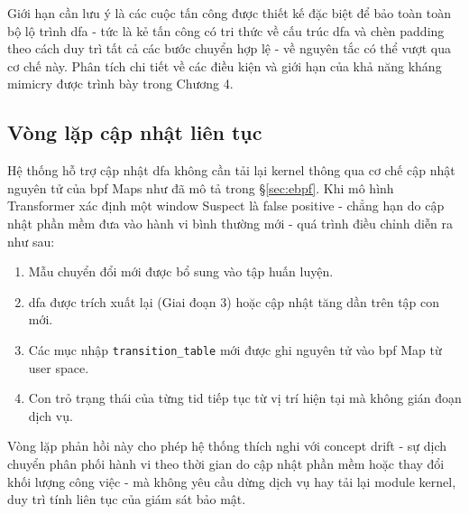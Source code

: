 \documentclass[../main.tex]{subfiles}
\begin{document}
Giới hạn cần lưu ý là các cuộc tấn công được thiết kế đặc biệt để bảo
toàn toàn bộ lộ
trình \gls{dfa} - tức là kẻ tấn công có tri thức về cấu trúc \gls{dfa} và chèn
padding theo cách
duy trì tất cả các bước chuyển hợp lệ - về nguyên tắc có thể vượt qua
cơ chế này. Phân
tích chi tiết về các điều kiện và giới hạn của khả năng kháng mimicry
được trình bày
trong Chương 4.

\subsection{Vòng lặp cập nhật liên tục}
\label{sec:update_loop}

Hệ thống hỗ trợ cập nhật \gls{dfa} không cần tải lại kernel thông qua cơ
chế cập nhật nguyên
tử của \gls{bpf} Maps như đã mô tả trong §\ref{sec:ebpf}. Khi mô hình
Transformer xác định
một window Suspect là false positive - chẳng hạn do cập nhật phần mềm
đưa vào hành vi bình
thường mới - quá trình điều chỉnh diễn ra như sau:

\begin{enumerate}
  \item Mẫu chuyển đổi mới được bổ sung vào tập huấn luyện.
  \item \gls{dfa} được trích xuất lại (Giai đoạn 3) hoặc cập nhật tăng dần
    trên tập con mới.
  \item Các mục nhập \texttt{transition\_table} mới được ghi nguyên
    tử vào \gls{bpf} Map
    từ user space.
  \item Con trỏ trạng thái của từng \gls{tid} tiếp tục từ vị trí hiện tại
    mà không gián đoạn
    dịch vụ.
\end{enumerate}

Vòng lặp phản hồi này cho phép hệ thống thích nghi với concept drift
\cite{yang2021cade,han2023owad} - sự dịch chuyển phân phối hành vi
theo thời gian do
cập nhật phần mềm hoặc thay đổi khối lượng công việc - mà không yêu
cầu dừng dịch vụ
hay tải lại module kernel, duy trì tính liên tục của giám sát bảo mật.
\end{document}
